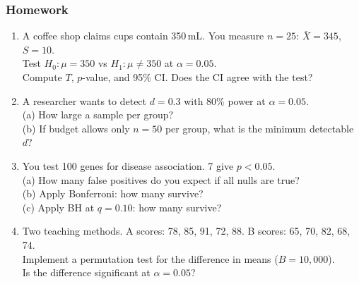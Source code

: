 \documentclass[aspectratio=169]{beamer}
\begin{document}
\begin{frame}
\frametitle{Homework}
\begin{enumerate}\setlength{\itemsep}{6pt}
  \item A coffee shop claims cups contain 350\,mL. You measure $n = 25$: $\bar{X} = 345$, $S = 10$.\\
    Test $H_0: \mu = 350$ vs $H_1: \mu \neq 350$ at $\alpha = 0.05$.\\
    Compute $T$, $p$-value, and 95\% CI. Does the CI agree with the test?

  \item A researcher wants to detect $d = 0.3$ with 80\% power at $\alpha = 0.05$.\\
    (a) How large a sample per group?\\
    (b) If budget allows only $n = 50$ per group, what is the minimum detectable $d$?

  \item You test 100 genes for disease association. 7 give $p < 0.05$.\\
    (a) How many false positives do you expect if all nulls are true?\\
    (b) Apply Bonferroni: how many survive?\\
    (c) Apply BH at $q = 0.10$: how many survive?

  \item Two teaching methods. A scores: 78, 85, 91, 72, 88. B scores: 65, 70, 82, 68, 74.\\
    Implement a permutation test for the difference in means ($B = 10{,}000$).\\
    Is the difference significant at $\alpha = 0.05$?
\end{enumerate}
\end{frame}
\end{document}

